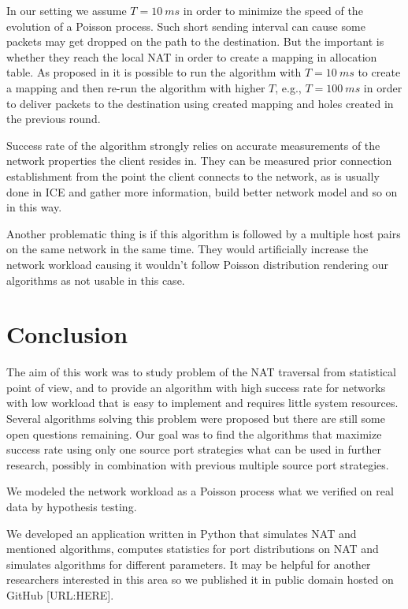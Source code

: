 \documentclass{llncs}
\begin{document}
In our setting we assume $T=10~ms$ in order to minimize the speed of the evolution of a Poisson process.
Such short sending interval can cause some packets may get dropped on the path to the destination. But the 
important is whether they reach the local NAT in order to create a mapping in allocation table. As proposed 
in \citep{Wang:2006:RSN:1156422.1156550} it is possible to run the algorithm with $T=10~ms$ to create a mapping
and then re-run the algorithm with higher $T$, e.g., $T=100~ms$ in order to deliver packets to the destination
using created mapping and holes created in the previous round.

Success rate of the algorithm strongly relies on accurate measurements of the network 
properties the client resides in. They can be measured prior connection establishment 
from the point the client connects to the network, as is usually done in ICE and gather 
more information, build better network model and so on in this way.


Another problematic thing is if this algorithm is followed by a multiple host pairs on
the same network in the same time. They would artificially increase the network workload
causing it wouldn't follow Poisson distribution rendering our algorithms as not usable in
this case.

\section{Conclusion}
The aim of this work was to study problem of the NAT traversal from statistical point of view,
and to provide an algorithm with high success rate for networks with low workload that is easy to 
implement and requires little system resources. 
Several algorithms solving this problem were proposed but there are still some open questions remaining. 
Our goal was to find the algorithms that maximize success rate using only one source port strategies 
what can be used in further research, possibly in combination with previous multiple source port strategies.

We modeled the network workload as a Poisson process what we verified on real data by hypothesis testing.

We developed an application written in Python that simulates NAT and mentioned algorithms, computes
statistics for port distributions on NAT and simulates algorithms for different parameters. It
may be helpful for another researchers interested in this area so we published it in public domain
hosted on GitHub [URL:HERE].
\end{document}
